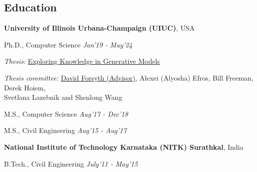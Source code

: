 \documentclass[margin,line]{res}
\newenvironment{list1}{
  \begin{list}{\ding{113}}{%
      \setlength{\itemsep}{0in}
      \setlength{\parsep}{0in} \setlength{\parskip}{0in}
      \setlength{\topsep}{0in} \setlength{\partopsep}{0in} 
      \setlength{\leftmargin}{0.17in}}}{\end{list}}
\begin{document}
\begin{resume}
\section{\sc \large Education}
{\bf University of Illinois Urbana-Champaign (UIUC)}, USA 
\\ \vspace*{-.12in}
\begin{list1}
\item[] Ph.D., Computer Science \hfill{\em Jan'19 - May'24}
\item[] {\em Thesis:} \underline{Exploring Knowledge in Generative Models}
\item[] {\em Thesis committee:} \underline{David Forsyth (Advisor)}, Alexei (Alyosha) Efros, Bill Freeman,
 Derek Hoiem, \\ Svetlana Lazebnik and Shenlong Wang   \hfill {}\\\vspace*{-.1in}
\item[] M.S., Computer Science \hfill{\em Aug'17 - Dec'18}
\item[] M.S., Civil Engineering \hfill{\em Aug'15 - Aug'17}
\end{list1}
{\bf National Institute of Technology Karnataka (NITK) Surathkal}, India
\\\vspace*{-.12in}
\begin{list1}
\item[] B.Tech., Civil Engineering \hfill{\em July'11 - May'15}
\end{list1}


\end{resume}
\end{document}
